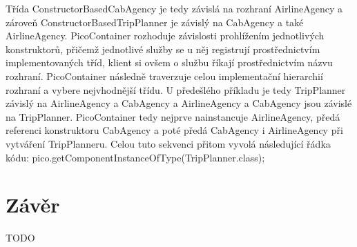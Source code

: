 \documentclass[a4paper,conference]{IEEEtran}
\begin{document}
Třída ConstructorBasedCabAgency je tedy závislá na rozhraní AirlineAgency a zároveň ConstructorBasedTripPlanner je závislý na CabAgency a také AirlineAgency.
PicoContainer rozhoduje závislosti prohlížením jednotlivých konstruktorů, přičemž jednotlivé služby se u něj registrují prostřednictvím implementovaných tříd, klient si ovšem o službu říkají prostřednictvím názvu rozhraní. PicoContainer následně traverzuje celou implementační hierarchií rozhraní a vybere nejvhodnější třídu.
U předešlého příkladu je tedy TripPlanner závislý na AirlineAgency a CabAgency a AirlineAgency a CabAgency jsou závislé na TripPlanner. PicoContainer tedy nejprve nainstancuje AirlineAgency, předá referenci konstruktoru CabAgency a poté předá CabAgency i AirlineAgency při vytváření TripPlanneru. Celou tuto sekvenci přitom vyvolá následující řádka kódu:
pico.getComponentInstanceOfType(TripPlanner.class);

\section{Závěr}

TODO



% 
% 
% 
% 





\end{document}
